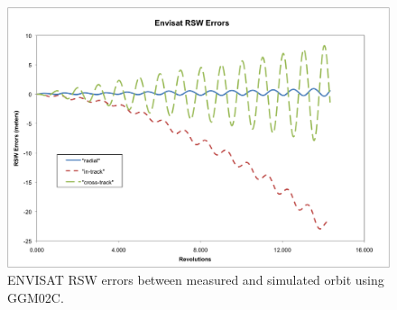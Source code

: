 \begin{description}
\begin{figure}
\includegraphics [width=7in]{figs/envisat/envsat_err.png}
\caption{ENVISAT RSW errors between measured and simulated orbit using GGM02C.}
\label{fig:3}
\end{figure}

\clearpage
\pagebreak

\end{description}
\newpage

